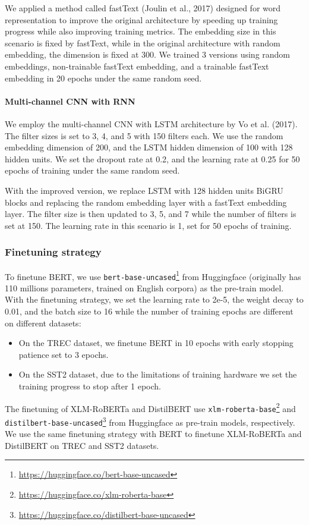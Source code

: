\documentclass[sn-mathphys,Numbered]{sn-jnl}%
\theoremstyle{thmstyleone}%
\theoremstyle{thmstyletwo}%
\theoremstyle{thmstylethree}%
\begin{document}
We applied a method called fastText (Joulin et al., 2017)\cite{Joulin2017} designed for word representation to improve the original architecture by speeding up training progress while also improving training metrics. The embedding size in this scenario is fixed by fastText, while in the original architecture with random embedding, the dimension is fixed at 300. We trained 3 versions using random embeddings, non-trainable fastText embedding, and a trainable fastText embedding in 20 epochs under the same random seed.

\paragraph{Multi-channel CNN with RNN}
We employ the multi-channel CNN with LSTM architecture by Vo et al. (2017). The filter sizes is set to 3, 4, and 5 with 150 filters each. We use the random embedding dimension of 200, and the LSTM hidden dimension of 100 with 128 hidden units. We set the dropout rate at 0.2, and the learning rate at 0.25 for 50 epochs of training under the same random seed.

With the improved version, we replace LSTM with 128 hidden units BiGRU blocks and replacing the random embedding layer with a fastText embedding layer. The filter size is then updated to 3, 5, and 7 while the number of filters is set at 150. The learning rate in this scenario is 1, set for 50 epochs of training.

\subsubsection{Finetuning strategy}
To finetune BERT, we use \texttt{bert-base-uncased}\footnote{\url{https://huggingface.co/bert-base-uncased}} from Huggingface (originally has 110 millions parameters, trained on English corpora) as the pre-train model. With the finetuning strategy, we set the learning rate to 2e-5, the weight decay to 0.01, and the batch size to 16 while the number of training epochs are different on different datasets:
\begin{itemize}
\item On  the TREC dataset, we finetune BERT in 10 epochs with early stopping patience set to 3 epochs.
\item On the SST2 dataset, due to the limitations of training hardware we set the training progress to stop after 1 epoch.
\end{itemize}

The finetuning of XLM-RoBERTa and DistilBERT use \texttt{xlm-roberta-base}\footnote{\url{https://huggingface.co/xlm-roberta-base}} and \texttt{distilbert-base-uncased}\footnote{\url{https://huggingface.co/distilbert-base-uncased}} from Huggingface as pre-train models, respectively. We use the same finetuning strategy with BERT to finetune XLM-RoBERTa and DistilBERT on TREC and SST2 datasets.
\end{document}
